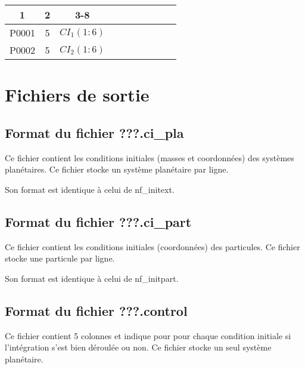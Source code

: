 \documentclass[11pt]{article}
\begin{document}
\begin{tabular}{|c|c|c|c|c|c|c|c|c|c|} \hline
1 &  2 &  3-8 \\ \hline
P0001 &5 &$CI_1(1:6)$ \\    \hline
P0002 &5 &$CI_2(1:6)$ \\    \hline
\end{tabular}

\section{Fichiers de sortie}

\subsection{Format du fichier {\bf ???.ci\_pla} }

Ce fichier contient les conditions initiales (masses et coordonn\'ees) des syst\`emes plan\'etaires. 
Ce fichier stocke un syst\`eme plan\'etaire par ligne.

Son format est identique \`a   celui de nf\_initext.

\subsection{Format du fichier {\bf ???.ci\_part} }

Ce fichier contient les conditions initiales (coordonn\'ees) des particules. 
Ce fichier stocke une particule par ligne.

Son format est identique \`a   celui de nf\_initpart.

\subsection{Format du fichier {\bf ???.control} }

Ce fichier contient 5 colonnes et indique pour pour chaque condition initiale si l'int\'egration s'est bien d\'eroul\'ee ou non.
Ce fichier stocke un seul syst\`eme plan\'etaire.
\end{document}
